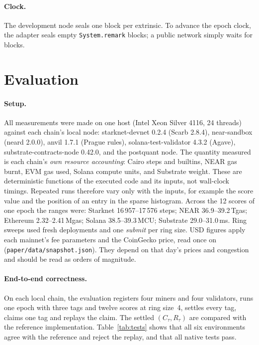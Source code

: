 \documentclass[11pt]{article}
\theoremstyle{remark}
\newcommand{\tg}{\tau}
\begin{document}
\paragraph{Clock.} The development node seals one block per extrinsic. To advance the epoch clock, the adapter seals empty \texttt{System.remark} blocks; a public network simply waits for blocks.

\section{Evaluation}\label{sec:eval}

\paragraph{Setup.} All measurements were made on one host (Intel Xeon Silver 4116, 24 threads) against each chain's local node: starknet-devnet 0.2.4 (Scarb 2.8.4), near-sandbox (neard 2.0.0), anvil 1.7.1 (Prague rules), solana-test-validator 4.3.2 (Agave), substrate-contracts-node 0.42.0, and the postquant node. The quantity measured is each chain's \emph{own resource accounting}: Cairo steps and builtins, NEAR gas burnt, EVM gas used, Solana compute units, and Substrate weight. These are deterministic functions of the executed code and its inputs, not wall-clock timings. Repeated runs therefore vary only with the inputs, for example the score value and the position of an entry in the sparse histogram. Across the 12 scores of one epoch the ranges were: Starknet 16\,957--17\,576 steps; NEAR 36.9--39.2\,Tgas; Ethereum 2.32--2.41\,Mgas; Solana 38.5--39.3\,MCU; Substrate 29.0--31.0\,ms. Ring sweeps used fresh deployments and one \emph{submit} per ring size. USD figures apply each mainnet's fee parameters and the CoinGecko price, read once on \snapdate{} (\texttt{paper/data/snapshot.json}). They depend on that day's prices and congestion and should be read as orders of magnitude.

\paragraph{End-to-end correctness.} On each local chain, the evaluation registers four miners and four validators, runs one epoch with three tags and twelve scores at ring size~4, settles every tag, claims one tag and replays the claim. The settled $(C_\tg,R_\tg)$ are compared with the reference implementation. Table~\ref{tab:tests} shows that all six environments agree with the reference and reject the replay, and that all \testsNative{} native tests pass.
\end{document}
